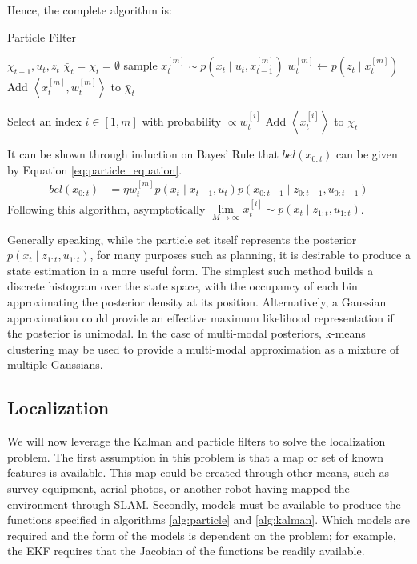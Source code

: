 \documentclass[english]{article}
\begin{document}
Hence, the complete algorithm is:
\begin{algorithm}
\caption{Particle Filter}
\label{alg:particle}
\begin{algorithmic}
	\REQUIRE $\chi_{t-1}, u_t, z_t$
        \STATE $\bar{\chi}_t = \chi_t = \emptyset$
        \STATE sample $x^{[m]}_t \sim p(x_t \mid u_t,x^{[m]}_{t-1})$
        \STATE $w^{[m]}_t \leftarrow p(z_t \mid x^{[m]}_t)$
        \STATE Add $\left\langle x^{[m]}_t, w^{[m]}_t \right\rangle$ to $\bar{\chi}_t$
        \ENDFOR

        \STATE Select an index $i \in [1,m]$ with probability $\propto w^{[i]}_t$
        \STATE Add $\left\langle x^{[i]}_t \right\rangle$ to $\chi_t$
        \ENDFOR

\end{algorithmic}
\end{algorithm}

It can be shown through induction on Bayes' Rule that $bel(x_{0:t})$ can be given by Equation \ref{eq:particle_equation}.
\begin{align}
  bel(x_{0:t}) & = \eta w^{[m]}_tp(x_t \mid x_{t-1}, u_t)p(x_{0:t-1} \mid z_{0:t-1},u_{0:t-1}) \label{eq:particle_equation}
\end{align}
Following this algorithm, asymptotically $\underset{M \to \infty}{\lim} x^{[i]}_t \sim p(x_t \mid z_{1:t}, u_{1:t})$.

Generally speaking, while the particle set itself represents the posterior $p(x_t \mid z_{1:t}, u_{1:t})$, for many purposes such as planning, it is desirable to produce a state estimation in a more useful form. The simplest such method builds a discrete histogram over the state space, with the occupancy of each bin approximating the posterior density at its position. Alternatively, a Gaussian approximation could provide an effective maximum likelihood representation if the posterior is unimodal. In the case of multi-modal posteriors, k-means clustering may be used to provide a multi-modal approximation as a mixture of multiple Gaussians\cite{probrob}.
\subsection{Localization}
We will now leverage the Kalman and particle filters to solve the localization problem. The first assumption in this problem is that a map or set of known features is available. This map could be created through other means, such as survey equipment, aerial photos, or another robot having mapped the environment through SLAM. Secondly, models must be available to produce the functions specified in algorithms \ref{alg:particle} and \ref{alg:kalman}. Which models are required and the form of the models is dependent on the problem; for example, the EKF requires that the Jacobian of the functions be readily available.
\end{document}
